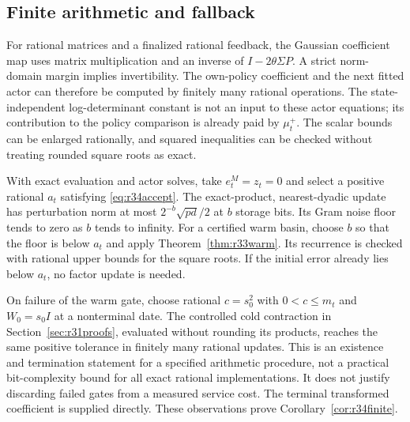 \subsection{Finite arithmetic and fallback}
For rational matrices and a finalized rational feedback, the Gaussian
coefficient map uses matrix multiplication and an inverse of
$I-2\theta\Sigma P$. A strict norm-domain margin implies invertibility.
The own-policy coefficient and the next fitted actor can therefore be
computed by finitely many rational operations. The state-independent
log-determinant constant is not an input to these actor equations; its
contribution to the policy comparison is already paid by $\mu_t^+$.
The scalar bounds can be enlarged rationally, and squared inequalities can
be checked without treating rounded square roots as exact.

With exact evaluation and actor solves, take $e_t^M=z_t=0$ and select a
positive rational $a_t$ satisfying \eqref{eq:r34accept}. The exact-product,
nearest-dyadic update has perturbation norm at most
$2^{-b}\sqrt{pd}/2$ at $b$ storage bits. Its Gram noise floor tends to zero
as $b$ tends to infinity. For a certified warm basin, choose $b$ so that the
floor is below $a_t$ and apply Theorem~\ref{thm:r33warm}. Its recurrence is
checked with rational upper bounds for the square roots. If the initial
error already lies below $a_t$, no factor update is needed.

On failure of the warm gate, choose rational $c=s_0^2$ with $0<c\leq m_t$
and $W_0=s_0I$ at a nonterminal date. The controlled cold contraction in
Section~\ref{sec:r31proofs}, evaluated without rounding its products, reaches
the same positive tolerance in finitely many rational updates. This is an
existence and termination statement for a specified arithmetic procedure,
not a practical bit-complexity bound for all exact rational implementations.
It does not justify discarding failed gates from a measured service cost.
The terminal transformed coefficient is supplied directly. These observations
prove Corollary~\ref{cor:r34finite}.
